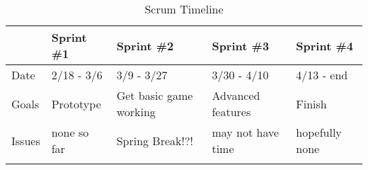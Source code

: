 \documentclass[12pt]{article}
\begin{document}
\begin{table}[h]
\centering
\begin{tabular}{|l|l|l|l|l|}
\hline
& Sprint \#1 & Sprint \#2 & Sprint \#3 & Sprint \#4 \\ \hline
Date & 2/18 - 3/6 & 3/9 - 3/27 & 3/30 - 4/10 & 4/13 - end \\ \hline
Goals & Prototype & Get basic game working & Advanced features & Finish \\ \hline
Issues & none so far & Spring Break!?! & may not have time & hopefully none \\ \hline
&  &  &  &  \\ \hline
\end{tabular}
\caption{Scrum Timeline}
\label{timeline}
\end{table}




\end{document}

